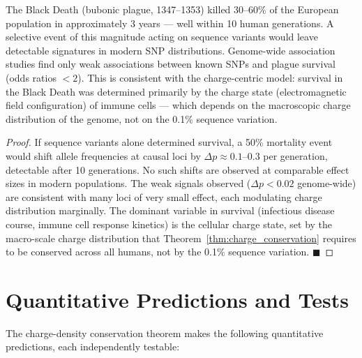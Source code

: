 \begin{proposition}
\label{prop:charge_dominance}
The Black Death (bubonic plague, 1347--1353) killed 30--60\% of the
European population in approximately 3 years --- well within 10
human generations. A selective event of this magnitude acting on
sequence variants would leave detectable signatures in modern SNP
distributions. Genome-wide association studies find only weak
associations between known SNPs and plague survival (odds ratios
$< 2$). This is consistent with the charge-centric model: survival
in the Black Death was determined primarily by the charge state
(electromagnetic field configuration) of immune cells --- which
depends on the macroscopic charge distribution of the genome, not
on the 0.1\% sequence variation.
\end{proposition}

\begin{proof}
If sequence variants alone determined survival, a 50\% mortality event
would shift allele frequencies at causal loci by $\Delta p \approx 0.1$--$0.3$
per generation, detectable after 10 generations. No such shifts are
observed at comparable effect sizes in modern populations. The weak
signals observed ($\Delta p < 0.02$ genome-wide) are consistent with
many loci of very small effect, each modulating charge distribution
marginally. The dominant variable in survival (infectious disease
course, immune cell response kinetics) is the cellular charge state,
set by the macro-scale charge distribution that Theorem~\ref{thm:charge_conservation}
requires to be conserved across all humans, not by the 0.1\% sequence
variation. $\blacksquare$
\end{proof}

\section{Quantitative Predictions and Tests}
\label{sec:predictions}

The charge-density conservation theorem makes the following quantitative
predictions, each independently testable:

